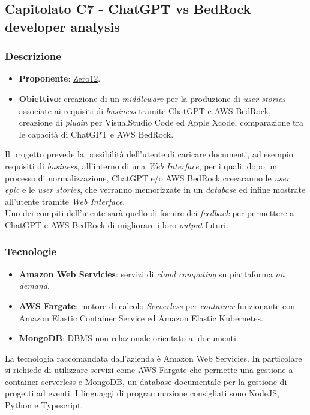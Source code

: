\subsection{Capitolato C7 - ChatGPT vs BedRock developer analysis}


\subsubsection{Descrizione}
\begin{itemize}
    \item \textbf{Proponente}: \href{https://www.zero12.it/}{Zero12}.
    \item \textbf{Obiettivo}: creazione di un \textit{middleware} per la produzione di \textit{user stories} associate ai requisiti di \textit{business} tramite ChatGPT e AWS BedRock, creazione di \textit{plugin} per VisualStudio Code ed Apple Xcode, comparazione tra le capacità di ChatGPT e AWS BedRock.
\end{itemize}
Il progetto prevede la possibilità dell'utente di caricare documenti, ad esempio requisiti di \textit{business}, all'interno di una \textit{Web Interface}, per i quali, dopo un processo di normalizzazione, ChatGPT e/o AWS BedRock creearanno le \textit{user epic} e le \textit{user stories}, che verranno memorizzate in un \textit{database} ed infine mostrate all'utente tramite \textit{Web Interface}.\\
Uno dei compiti dell'utente sarà quello di fornire dei \textit{feedback} per permettere a ChatGPT e AWS BedRock di migliorare i loro \textit{output} futuri.


\subsubsection{Tecnologie}
\begin{itemize}
    \item \textbf{Amazon Web Servicies}: servizi di \textit{cloud computing} su piattaforma \textit{on demand}.
    \item \textbf{AWS Fargate}: motore di calcolo \textit{Serverless} per \textit{container} funzionante con Amazon Elastic Container Service ed Amazon Elastic Kubernetes.
    \item \textbf{MongoDB}: DBMS non relazionale orientato ai documenti.
\end{itemize}
La tecnologia raccomandata dall'azienda è Amazon Web Servicies. 
In particolare si richiede di utilizzare servizi come AWS Fargate che permette una gestione a container serverless e MongoDB, un database documentale per la gestione di progetti ad eventi.
I linguaggi di programmazione consigliati sono NodeJS, Python e Typescript.


